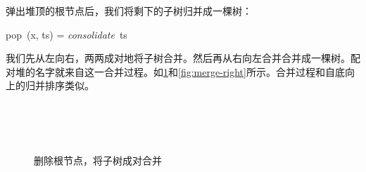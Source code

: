 \documentclass[b5paper]{ctexart}
\begin{document}
弹出堆顶的根节点后，我们将剩下的子树归并成一棵树：

\be
pop\ (x, ts) = \textit{consolidate}\ ts
\ee

我们先从左向右，两两成对地将子树合并。然后再从右向左合并合并成一棵树。配对堆的名字就来自这一合并过程。如\cref{fig:merge-pairs}和\cref{fig:merge-right}所示。合并过程和自底向上的归并排序\cite{okasaki-book}类似。

\begin{figure}[htbp]
  \centering
   \\
   \\
   \\
  \caption{删除根节点，将子树成对合并}
  \label{fig:merge-pairs}
\end{figure}
\end{document}
